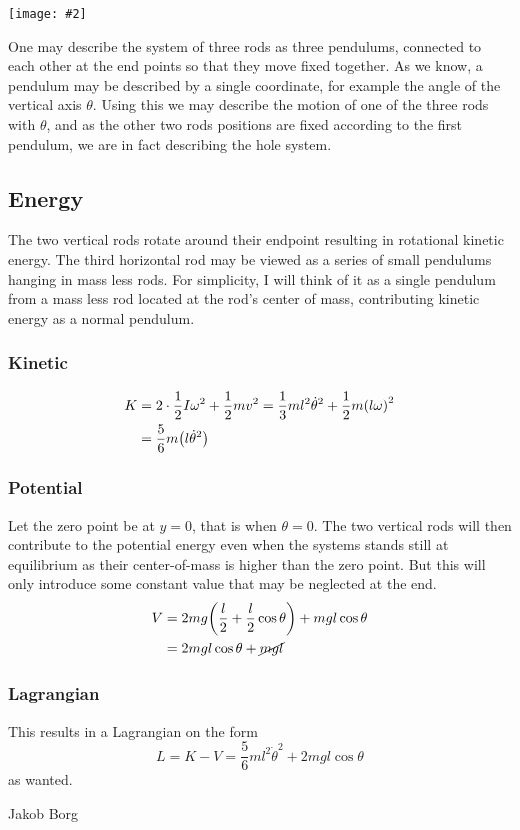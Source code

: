 \documentclass[11pt,a4paper]{report}
\newenvironment{solution}
    {\begin{tcolorbox}[title=Solution,halign lower=right,breakable]
    }
    {
    \tcblower Jakob Borg
    \end{tcolorbox}
	\vspace{5mm}
    }
\newcommand{\fig}[2][]
{
\begin{center}
\texttt{[image: \#2]}
\captionof{figure}{#1}
\label{fig:fig\arabic{figure}}
\end{center}
}
\begin{document}
\begin{solution}
\fig{./vectorfigurer/fig_006.png}
One may describe the system of three rods as three pendulums, connected to each other at the end points so that they move fixed together. As we know, a pendulum may be described by a single coordinate, for example the angle of the vertical axis $\theta$. Using this we may describe the motion of one of the three rods with $\theta$, and as the other two rods positions are fixed according to the first pendulum, we are in fact describing the hole system.

\subsection*{Energy}
The two vertical rods rotate around their endpoint resulting in rotational kinetic energy. The third horizontal rod may be viewed as a series of small pendulums hanging in mass less rods. For simplicity, I will think of it as a single pendulum from a mass less rod located at the rod's center of mass, contributing kinetic energy as a normal pendulum.
\subsubsection*{Kinetic}
\begin{align*}
	K &= 2 \cdot \frac{1}{2}I \omega^2 + \frac{1}{2}mv^2 
	= \frac{1}{3}ml^2 \dot{\theta}^2 + \frac{1}{2}m\qty(l\omega)^2
	\\
	&= \frac{5}{6}m\qty(l\dot{\theta}^2)
\end{align*}
\subsubsection*{Potential}
Let the zero point be at $y=0$, that is when $\theta = 0$. The two vertical rods will then contribute to the potential energy even when the systems stands still at equilibrium as their center-of-mass is higher than the zero point. But this will only introduce some constant value that may be neglected at the end.
\begin{align*}
	V &=2mg\qty(\frac{l}{2}+\frac{l}{2}\cos \theta) + mgl\cos \theta
	\\
	&= 2mgl\cos \theta + \cancel{mgl}
\end{align*}
\subsubsection*{Lagrangian}
This results in a Lagrangian on the form
\begin{equation*}
	L = K - V = \frac{5}{6}ml^2\dot{\theta}^2 + 2mgl\cos \theta
\end{equation*}
as wanted.

\end{solution}
\end{document}
